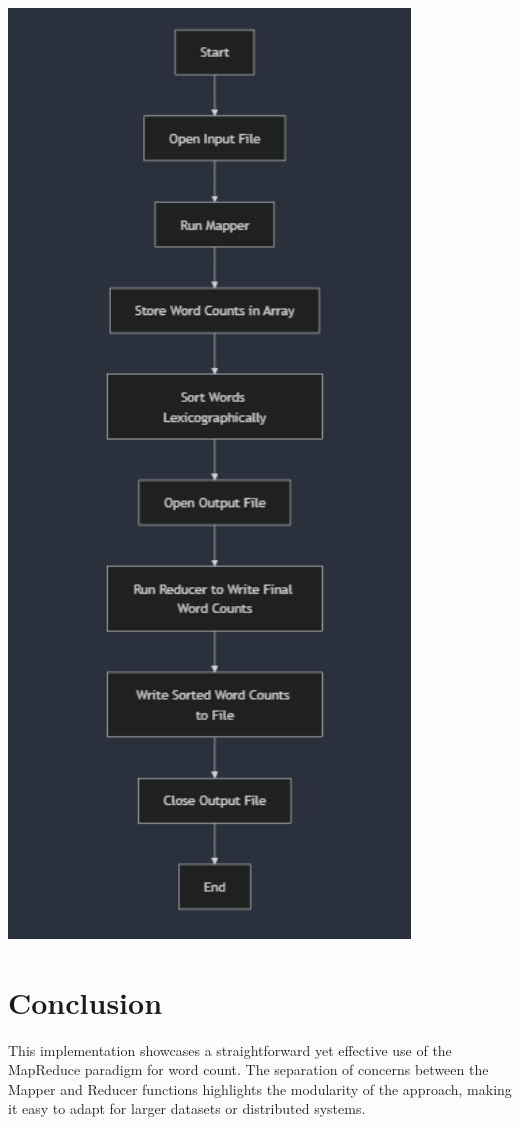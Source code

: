 \documentclass[12pt]{article}
\begin{document}
\begin{center}
    \includegraphics[width=0.8\textwidth]{wordcount-flowchart.png} %
\end{center}

\section*{Conclusion}
This implementation showcases a straightforward yet effective use of the MapReduce paradigm for word count. The separation of concerns between the Mapper and Reducer functions highlights the modularity of the approach, making it easy to adapt for larger datasets or distributed systems.
\end{document}
